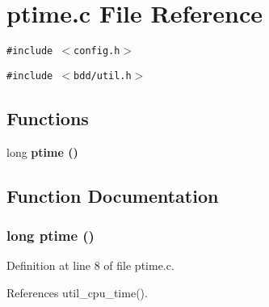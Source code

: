 \section{ptime.c File Reference}
\label{ptime_8c}
{\tt \#include $<$config.h$>$}\par
{\tt \#include $<$bdd/util.h$>$}\par
\subsection*{Functions}
\begin{CompactItemize}
\item 
long \bf{ptime} ()
\end{CompactItemize}


\subsection{Function Documentation}
\subsubsection{\setlength{\rightskip}{0pt plus 5cm}long ptime ()}\label{ptime_8c_a3dbf9b5e77d5d924e6425786a762282}




Definition at line 8 of file ptime.c.

References util\_\-cpu\_\-time().